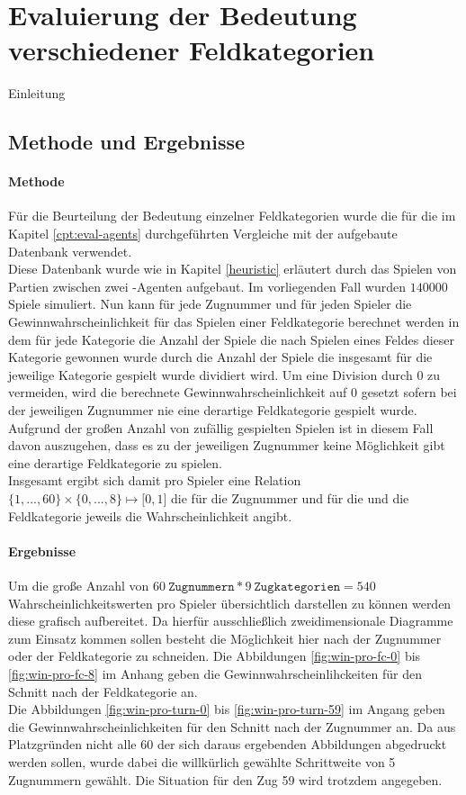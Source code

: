 \section{Evaluierung der Bedeutung verschiedener Feldkategorien}
Einleitung
\subsection{Methode und Ergebnisse}
\paragraph{Methode}
Für die Beurteilung der Bedeutung einzelner Feldkategorien wurde die für die im Kapitel \ref{cpt:eval-agents} durchgeführten Vergleiche mit der  aufgebaute Datenbank verwendet.
\\Diese Datenbank wurde wie in Kapitel \ref{heuristic} erläutert durch das Spielen von Partien zwischen zwei -Agenten aufgebaut. Im vorliegenden Fall wurden $140000$ Spiele simuliert. Nun kann für jede Zugnummer und für jeden Spieler die Gewinnwahrscheinlichkeit für das Spielen einer Feldkategorie berechnet werden in dem für jede Kategorie die Anzahl der Spiele die nach Spielen eines Feldes dieser Kategorie gewonnen wurde durch die Anzahl der Spiele die insgesamt für die jeweilige Kategorie gespielt wurde dividiert wird. Um eine Division durch $0$ zu vermeiden, wird die berechnete Gewinnwahrscheinlichkeit auf $0$ gesetzt sofern bei der jeweiligen Zugnummer nie eine derartige Feldkategorie gespielt wurde. Aufgrund der großen Anzahl von zufällig gespielten Spielen ist in diesem Fall davon auszugehen, dass es zu der jeweiligen Zugnummer keine Möglichkeit gibt eine derartige Feldkategorie zu spielen. 
\\Insgesamt ergibt sich damit pro Spieler eine Relation $\lbrace1, ..., 60\rbrace\times\lbrace0, ..., 8\rbrace\mapsto\lbrack0,1\rbrack$ die für die Zugnummer und für die und die Feldkategorie jeweils die Wahrscheinlichkeit angibt.
  
\paragraph{Ergebnisse}
Um die große Anzahl von $60\ \mathtt{Zugnummern} * 9\ \mathtt{Zugkategorien} = 540$ Wahrscheinlichkeitswerten pro Spieler übersichtlich darstellen zu können werden diese grafisch aufbereitet. Da hierfür ausschließlich zweidimensionale Diagramme zum Einsatz kommen sollen besteht die Möglichkeit hier nach der Zugnummer oder der Feldkategorie zu schneiden. Die Abbildungen \ref{fig:win-pro-fc-0} bis \ref{fig:win-pro-fc-8} im Anhang geben die Gewinnwahrscheinlihckeiten für den Schnitt nach der Feldkategorie an.
\\Die Abbildungen \ref{fig:win-pro-turn-0} bis \ref{fig:win-pro-turn-59} im Angang geben die Gewinnwahrscheinlichkeiten für den Schnitt nach der Zugnummer an. Da aus Platzgründen nicht alle 60 der sich daraus ergebenden Abbildungen abgedruckt werden sollen, wurde dabei die willkürlich gewählte Schrittweite von 5 Zugnummern gewählt. Die Situation für den Zug 59 wird trotzdem angegeben.

